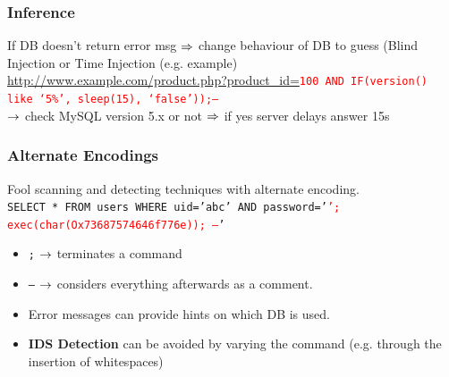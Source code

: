 \documentclass[english, leagacyboxes, nologo]{latex4ei/latex4ei_sheet}
\begin{document}
{    \subsubsection{Inference}
      If DB doesn't return error msg $\Rightarrow$ change behaviour of DB to guess (Blind Injection or Time Injection (e.g. example)\\
      \url{http://www.example.com/product.php?product_id=}\texttt{\textcolor{red}{100 AND IF(version() like ‘5\%’, sleep(15), ‘false’));--}}\\
      $\rightarrow$ check MySQL version 5.x or not $\Rightarrow$ if yes server delays answer 15s


    \subsubsection{Alternate Encodings}
    Fool scanning and detecting techniques with alternate encoding.\\
    \texttt{SELECT * FROM users WHERE uid=’abc’ AND password=’\textcolor{red}{’; exec(char(Ox73687574646f776e)); --}'}

    \begin{itemize}
      \item \texttt{;} $\rightarrow$ terminates a command
      \item \texttt{--} $\rightarrow$ considers everything afterwards as a comment.
      \item Error messages can provide hints on which DB is used.
      \item \textbf{IDS Detection} can be avoided by varying the command (e.g. through the insertion of whitespaces)
    \end{itemize}
  }

\end{document}
